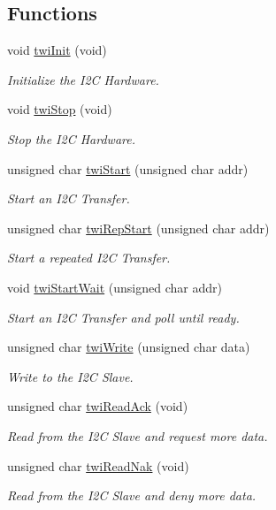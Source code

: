 \subsection*{Functions}
\begin{DoxyCompactItemize}
\item 
void \hyperlink{group__twi_ga1a9c88673ee82a5a84274814f168ea78}{twi\-Init} (void)
\begin{DoxyCompactList}\small\item\em Initialize the I2\-C Hardware. \end{DoxyCompactList}\item 
void \hyperlink{group__twi_gabf581270e9537a60e2d8cf3d2c1543d1}{twi\-Stop} (void)
\begin{DoxyCompactList}\small\item\em Stop the I2\-C Hardware. \end{DoxyCompactList}\item 
unsigned char \hyperlink{group__twi_ga4f86edc73f37ce976ea2225519ab31cd}{twi\-Start} (unsigned char addr)
\begin{DoxyCompactList}\small\item\em Start an I2\-C Transfer. \end{DoxyCompactList}\item 
unsigned char \hyperlink{group__twi_ga996e3cbbbb7239e2278bd286e61f0791}{twi\-Rep\-Start} (unsigned char addr)
\begin{DoxyCompactList}\small\item\em Start a repeated I2\-C Transfer. \end{DoxyCompactList}\item 
void \hyperlink{group__twi_ga0988733f7d2d69888045b0a48463c088}{twi\-Start\-Wait} (unsigned char addr)
\begin{DoxyCompactList}\small\item\em Start an I2\-C Transfer and poll until ready. \end{DoxyCompactList}\item 
unsigned char \hyperlink{group__twi_gaf42e50aaf4a9794d3a2c000e7b407887}{twi\-Write} (unsigned char data)
\begin{DoxyCompactList}\small\item\em Write to the I2\-C Slave. \end{DoxyCompactList}\item 
unsigned char \hyperlink{group__twi_ga0ab816bd0abcc24d6817f8395de7eafd}{twi\-Read\-Ack} (void)
\begin{DoxyCompactList}\small\item\em Read from the I2\-C Slave and request more data. \end{DoxyCompactList}\item 
unsigned char \hyperlink{group__twi_ga5fad19b3784aeaa9ae995e64f9e965b8}{twi\-Read\-Nak} (void)
\begin{DoxyCompactList}\small\item\em Read from the I2\-C Slave and deny more data. \end{DoxyCompactList}\end{DoxyCompactItemize}


